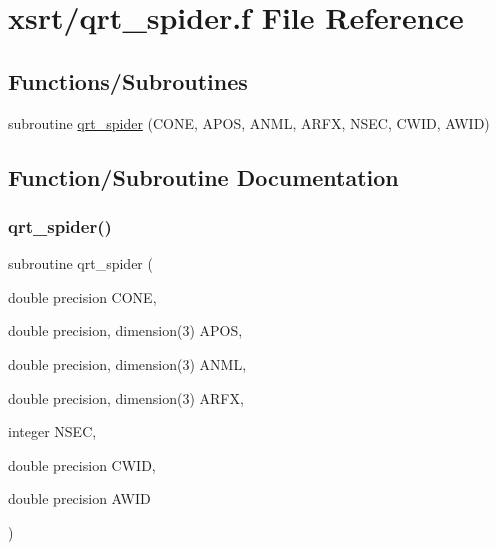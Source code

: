 \hypertarget{qrt__spider_8f}{}\section{xsrt/qrt\+\_\+spider.f File Reference}
\label{qrt__spider_8f}
\subsection*{Functions/\+Subroutines}
\begin{DoxyCompactItemize}
\item 
subroutine \hyperlink{qrt__spider_8f_a2117b06e54a6d65b2040da0bdf325c83}{qrt\+\_\+spider} (C\+O\+NE, A\+P\+OS, A\+N\+ML, A\+R\+FX, N\+S\+EC, C\+W\+ID, A\+W\+ID)
\end{DoxyCompactItemize}


\subsection{Function/\+Subroutine Documentation}
\mbox{\label{qrt__spider_8f_a2117b06e54a6d65b2040da0bdf325c83}} 
\subsubsection{\texorpdfstring{qrt\+\_\+spider()}{qrt\_spider()}}
{\footnotesize\ttfamily subroutine qrt\+\_\+spider (\begin{DoxyParamCaption}\item[{double precision}]{C\+O\+NE,  }\item[{double precision, dimension(3)}]{A\+P\+OS,  }\item[{double precision, dimension(3)}]{A\+N\+ML,  }\item[{double precision, dimension(3)}]{A\+R\+FX,  }\item[{integer}]{N\+S\+EC,  }\item[{double precision}]{C\+W\+ID,  }\item[{double precision}]{A\+W\+ID }\end{DoxyParamCaption})}

